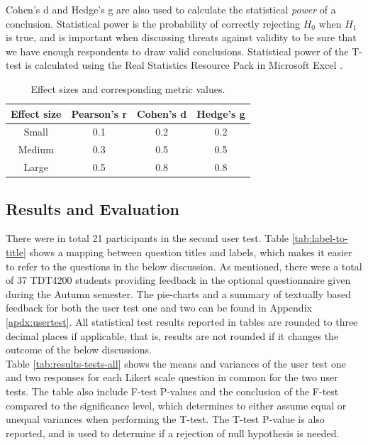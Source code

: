 Cohen's d and Hedge's g are also used to calculate the statistical \textit{power} of a conclusion. Statistical power is the probability of correctly rejecting $H_0$ when $H_1$ is true, and is important when discussing threats against validity to be sure that we have enough respondents to draw valid conclusions. Statistical power of the T-test is calculated using the Real Statistics Resource Pack in Microsoft Excel \cite{RSRP}.

\begin{table}[t!]
    \centering
    \begin{tabular}{ | c | c | c | c |}
    \hline
    \textbf{Effect size} & \textbf{Pearson's r} & \textbf{Cohen's d} & \textbf{Hedge's g} \\ \hline
    Small & 0.1 & 0.2 & 0.2 \\ \hline
    Medium & 0.3 & 0.5 & 0.5 \\ \hline
    Large & 0.5 & 0.8 & 0.8 \\ \hline
    \end{tabular}
    \caption{Effect sizes and corresponding metric values.}
    \label{tab:effect-size}
\end{table}

\subsection{Results and Evaluation}
\label{sub-sec:user-testing-results}
There were in total 21 participants in the second user test. Table \ref{tab:label-to-title} shows a mapping between question titles and labels, which makes it easier to refer to the questions in the below discussion. As mentioned, there were a total of 37 TDT4200 students providing feedback in the optional questionnaire given during the Autumn semester. The pie-charts and a summary of textually based feedback for both the user test one and two can be found in Appendix \ref{apdx:usertest}. All statistical test results reported in tables are rounded to three decimal places if applicable, that is, results are not rounded if it changes the outcome of the below discussions. \\

Table \ref{tab:results-tests-all} shows the means and variances of the user test one and two responses for each Likert scale question in common for the two user tests. The table also include F-test P-values and the conclusion of the F-test compared to the significance level, which determines to either assume equal or unequal variances when performing the T-test. The T-test P-value is also reported, and is used to determine if a rejection of null hypothesis is needed. \\

